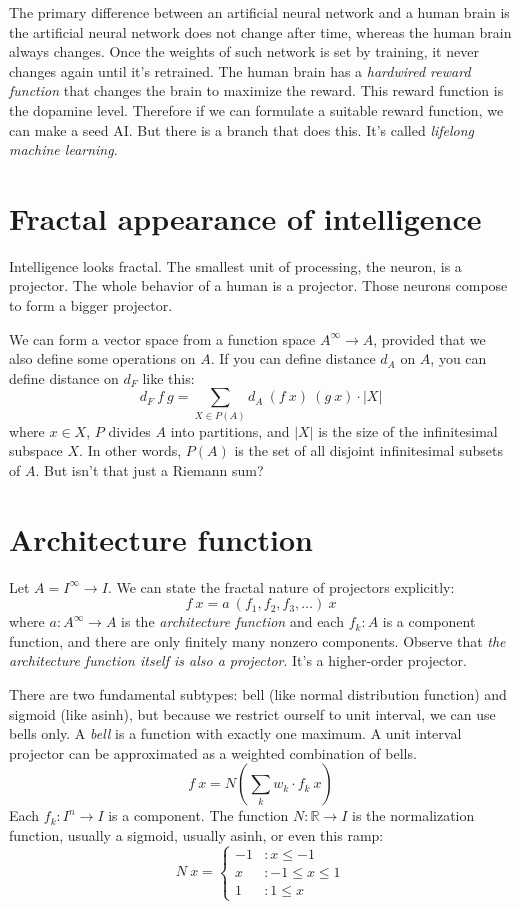 The primary difference between an artificial neural network and a human brain
is the artificial neural network does not change after time,
whereas the human brain always changes.
Once the weights of such network is set by training,
it never changes again until it's retrained.
The human brain has a \emph{hardwired reward function}
that changes the brain to maximize the reward.
This reward function is the dopamine level.
Therefore if we can formulate a suitable reward function,
we can make a seed AI.
But there is a branch that does this.
It's called \emph{lifelong machine learning}.

\section{Fractal appearance of intelligence}

Intelligence looks fractal.
The smallest unit of processing, the neuron, is a projector.
The whole behavior of a human is a projector.
Those neurons compose to form a bigger projector.

We can form a vector space from a function space \(A^\infty \to A\),
provided that we also define some operations on \(A\).
If you can define distance \(d_A\) on \(A\),
you can define distance on \(d_F\) like this:
\[
    d_F~f~g = \sum_{X \in P(A)} d_A~(f~x)~(g~x) \cdot |X|
\]
where \(x \in X\), \(P\) divides \(A\) into partitions,
and \(|X|\) is the size of the infinitesimal subspace \(X\).
In other words, \(P(A)\) is the set of all disjoint infinitesimal subsets of \(A\).
But isn't that just a Riemann sum?

\section{Architecture function}

Let \(A = I^\infty \to I\).
We can state the fractal nature of projectors explicitly:
\[
    f~x = a~(f_1,f_2,f_3,\ldots)~x
\]
where \(a : A^\infty \to A\) is the \emph{architecture function}
and each \(f_k : A\) is a component function,
and there are only finitely many nonzero components.
Observe that \emph{the architecture function itself is also a projector}.
It's a higher-order projector.

There are two fundamental subtypes:
bell (like normal distribution function) and sigmoid (like asinh),
but because we restrict ourself to unit interval,
we can use bells only.
A \emph{bell} is a function with exactly one maximum.
A unit interval projector can be approximated as a weighted combination of bells.
\[
    f~x = N \left( \sum_k w_k \cdot f_k~x \right)
\]
Each \(f_k : I^n \to I\) is a component.
The function \(N : \mathbb{R} \to I\) is the normalization function,
usually a sigmoid, usually asinh,
or even this ramp:
\[
    N~x =
    \begin{cases}
        -1 & : x \le -1
        \\
        x & : -1 \le x \le 1
        \\
        1 & : 1 \le x
    \end{cases}
\]

